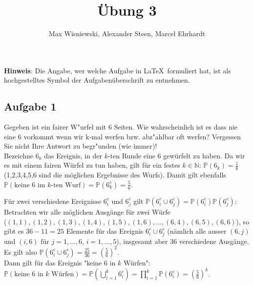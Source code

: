 \documentclass[11pt,a4paper,ngerman]{article}
\date{}
\title{Übung 3}
\author{Max Wisniewski\maxw, Alexander Steen\alex, Marcel Ehrhardt\marcel}
\newcommand{\Prob}{\mathbb{P}}
\begin{document}

\renewcommand{\figurename}{Figure}

\maketitle
\thispagestyle{fancy}

\begin{center}
\textbf{Hinweis}: Die Angabe, wer welche Aufgabe in \LaTeX\ formuliert hat, ist als hochgestelltes Symbol der Aufgabenüberschrift zu entnehmen.
\end{center}


\subsection*{Aufgabe 1}
Gegeben ist ein fairer W"urfel mit 6 Seiten. Wie wahrscheinlich ist es dass nie eine
6 vorkommt wenn wir k-mal werfen bzw. abz"ahlbar oft werfen? Vergessen Sie nicht
Ihre Antwort zu begr"unden (wie immer)!  \\

Bezeichne $6_k$ das Ereignis, in der $k$-ten Runde eine 6 gewürfelt zu haben.
Da wir es mit einem fairen Würfel zu tun haben, gilt für ein festes $k \in \mathbb{N}$:
$\Prob(6_k) = \frac{1}{6}$ (1,2,3,4,5,6 sind die möglichen Ergebnisse des Wurfs).
Damit gilt ebenfalls $\Prob(\text{keine 6 im $k$-ten Wurf}) = \Prob(6_k^c) = \frac{5}{6}$.

Für zwei verschiedene Ereignisse $6_i^c$ und $6_j^c$ gilt $\Prob(6_i^c \cup 6_j^c) = \Prob(6_i^c) \Prob(6_j^c)$: \\
Betrachten wir alle möglichen Ausgänge für zwei Würfe \\
($(1,1), (1,2), (1,3), (1,4), (1,5), (1,6), \ldots, (6,4), (6,5), (6,6)$), so gibt es $36 - 11 = 25$ Elemente für das Ereignis $6_i^c \cup 6_j^c$ (nämlich alle ausser $(6,j)$ und $(i,6)$ für $j = 1,\ldots,6$, $i = 1,\ldots,5$), insgesamt aber $36$ verschiedene Ausgänge.
Es gilt also $\Prob(6_i^c \cup 6_j^c) = \frac{25}{36} = \left(\frac{5}{6}\right)^2$. \\

Dann gilt für das Ereignis "keine 6 in $k$ Würfen":\\
$\Prob(\text{keine 6 in $k$ Würfen}) = \Prob(\bigcup_{i=1}^k 6_i^c)
= \prod_{i=1}^k \Prob(6_i^c) = \left(\frac{5}{6}\right)^k$.
\end{document}
